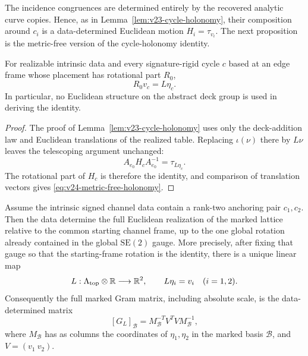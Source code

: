 The incidence congruences are determined entirely by the recovered analytic
curve copies.  Hence, as in Lemma~\ref{lem:v23-cycle-holonomy}, their
composition around \(c_i\) is a data-determined Euclidean motion
\(H_i=\tau_{v_i}\).  The next proposition is the metric-free version of the
cycle-holonomy identity.

\begin{proposition}
\label{prop:v24-metric-free-holonomy}
For realizable intrinsic data and every signature-rigid cycle \(c\) based at
an edge frame whose placement has rotational part \(R_0\),
\begin{equation}\label{eq:v24-metric-free-holonomy}
 R_0v_c=L\eta_c.
\end{equation}
In particular, no Euclidean structure on the abstract deck group is used in
deriving the identity.
\end{proposition}

\begin{proof}
The proof of Lemma~\ref{lem:v23-cycle-holonomy} uses only the deck-addition
law and Euclidean translations of the realized table.  Replacing
\(\iota(\nu)\) there by \(L\nu\) leaves the telescoping argument unchanged:
\[
 A_{e_0}H_cA_{e_0}^{-1}=\tau_{L\eta_c}.
\]
The rotational part of \(H_c\) is therefore the identity, and comparison of
translation vectors gives \eqref{eq:v24-metric-free-holonomy}.
\end{proof}

\begin{theorem}
\label{thm:v24-lattice-gram-recovery}
Assume the intrinsic signed channel data contain a rank-two anchoring pair
\(c_1,c_2\).  Then the data determine the full Euclidean realization of the
marked lattice relative to the common starting channel frame, up to the one
global rotation already contained in the global \(\mathrm{SE}(2)\) gauge.
More precisely, after fixing that gauge so that the starting-frame rotation is
the identity, there is a unique linear map
\begin{equation}\label{eq:v24-L-from-holonomy}
 L:\Lambda_{\rm top}\otimes\mathbb R\longrightarrow\mathbb R^2,
 \qquad L\eta_i=v_i\quad(i=1,2).
\end{equation}
Consequently the full marked Gram matrix, including absolute scale, is the
data-determined matrix
\begin{equation}\label{eq:v24-gram-matrix}
 [G_L]_{\mathcal B}=M_{\mathcal B}^{-T}V^TVM_{\mathcal B}^{-1},
\end{equation}
where \(M_{\mathcal B}\) has as columns the coordinates of
\(\eta_1,\eta_2\) in the marked basis \(\mathcal B\), and
\(V=(v_1\ v_2)\).
\end{theorem}

